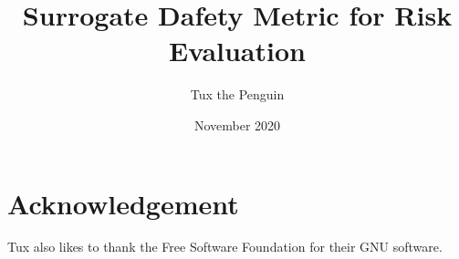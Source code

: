 \documentclass{article}
\title{Surrogate Dafety Metric for Risk Evaluation}
\author{Tux the Penguin}
\date{November 2020}
\begin{document}
\maketitle










\section*{Acknowledgement}

Tux also likes to thank the Free Software Foundation for their GNU software.



\end{document}
